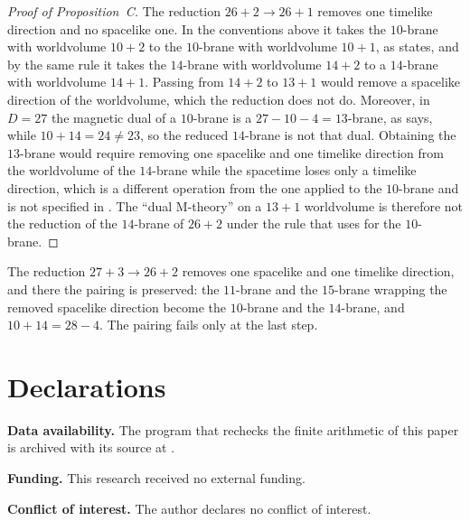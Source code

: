 \documentclass[11pt]{amsart}
\theoremstyle{remark}
\begin{document}
\begin{proof}[Proof of Proposition~C]
The reduction $26+2\to26+1$ removes one timelike direction and no spacelike one. In the conventions above it takes the $10$-brane with worldvolume $10+2$ to the $10$-brane with worldvolume $10+1$, as \cite{RMC20} states, and by the same rule it takes the $14$-brane with worldvolume $14+2$ to a $14$-brane with worldvolume $14+1$. Passing from $14+2$ to $13+1$ would remove a spacelike direction of the worldvolume, which the reduction does not do. Moreover, in $D=27$ the magnetic dual of a $10$-brane is a $27-10-4=13$-brane, as \cite{RMC20} says, while $10+14=24\ne23$, so the reduced $14$-brane is not that dual. Obtaining the $13$-brane would require removing one spacelike and one timelike direction from the worldvolume of the $14$-brane while the spacetime loses only a timelike direction, which is a different operation from the one applied to the $10$-brane and is not specified in \cite{RMC20}. The ``dual M-theory'' on a $13+1$ worldvolume is therefore not the reduction of the $14$-brane of $26+2$ under the rule that \cite{RMC20} uses for the $10$-brane.
\end{proof}

The reduction $27+3\to26+2$ removes one spacelike and one timelike direction, and there the pairing is preserved: the $11$-brane and the $15$-brane wrapping the removed spacelike direction become the $10$-brane and the $14$-brane, and $10+14=28-4$. The pairing fails only at the last step.

\section*{Declarations}

\noindent\textbf{Data availability.} The program that rechecks the finite arithmetic of this paper is archived with its source at \cite{Arch}.

\noindent\textbf{Funding.} This research received no external funding.

\noindent\textbf{Conflict of interest.} The author declares no conflict of interest.
\end{document}
